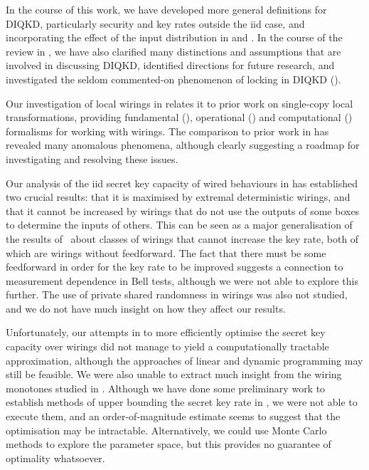 \documentclass[10pt, a4paper]{article}
\numberwithin{equation}{section} %
\theoremstyle{definition}
\theoremstyle{plain}
\newcommand{\?}{\mathrel{?}} %
\begin{document}
                        In the course of this work, we have developed more general definitions for DIQKD, particularly security and key rates outside the iid case, and incorporating the effect of the input distribution in  and . In the course of the review in , we have also clarified many distinctions and assumptions that are involved in discussing DIQKD, identified directions for future research, and investigated the seldom commented-on phenomenon of locking in DIQKD ().

                        Our investigation of local wirings in  relates it to prior work on single-copy local transformations, providing fundamental (), operational () and computational () formalisms for working with wirings. The comparison to prior work in  has revealed many anomalous phenomena, although clearly suggesting a roadmap for investigating and resolving these issues.

                        Our analysis of the iid secret key capacity of wired behaviours in  has established two crucial results: that it is maximised by extremal deterministic wirings, and that it cannot be increased by wirings that do not use the outputs of some boxes to determine the inputs of others. This can be seen as a major generalisation of the results of~\cite{JanLiThesis} about classes of wirings that cannot increase the key rate, both of which are wirings without feedforward. The fact that there must be some feedforward in order for the key rate to be improved suggests a connection to measurement dependence in Bell tests, although we were not able to explore this further. The use of private shared randomness in wirings was also not studied, and we do not have much insight on how they affect our results.

                        Unfortunately, our attempts in  to more efficiently optimise the secret key capacity over wirings did not manage to yield a computationally tractable approximation, although the approaches of linear and dynamic programming may still be feasible. We were also unable to extract much insight from the wiring monotones studied in . Although we have done some preliminary work to establish methods of upper bounding the secret key rate in , we were not able to execute them, and an order-of-magnitude estimate seems to suggest that the optimisation may be intractable. Alternatively, we could use Monte Carlo methods to explore the parameter space, but this provides no guarantee of optimality whatsoever.
\end{document}
